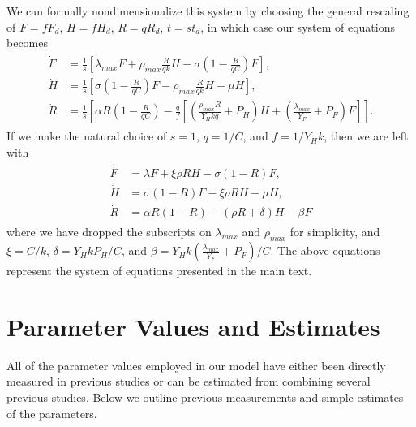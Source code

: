 \documentclass{pnastwo}
\begin{document}
\begin{article}
We can formally nondimensionalize this system by choosing the general rescaling of $F=fF_{d}$, $H=fH_{d}$, $R=qR_{d}$, $t=st_{d}$, in which case our system of equations becomes
\begin{align}
\begin{split}
\dot{F} &= \frac{1}{s}\left[\lambda_{max} F + \rho_{max}\frac{R}{qk}H - \sigma \left(1-\frac{R}{qC}\right)F\right],  \\
\dot{H} &= \frac{1}{s}\left[\sigma \left(1-\frac{R}{qC}\right)F - \rho_{max}\frac{R}{qk} H - \mu H\right],  \\
\dot{R} &= \frac{1}{s}\left[\alpha R\left(1-\frac{R}{qC}\right) -\frac{q}{f}\left[\left(\frac{\rho_{max}R}{Y_{H}kq}+P_{H}\right)H+\left(\frac{\lambda_{max}}{Y_{F}}+P_{F}\right) F\right]\right].
\end{split}
\end{align}
If we make the natural choice of $s=1$, $q=1/C$, and $f=1/Y_{H}k$, then we are left with
\begin{align}
\begin{split}
\dot{F} &= \lambda F + \xi \rho RH - \sigma \left(1-R\right)F,  \\
\dot{H} &= \sigma \left(1-R\right)F - \xi \rho RH - \mu H,  \\
\dot{R} &= \alpha R\left(1-R\right) -\left(\rho R+\delta\right)H-\beta F
\end{split}
\end{align}
where we have dropped the subscripts on $\lambda_{max}$ and $\rho_{max}$ for simplicity, and $\xi=C/k$, $\delta=Y_{H}kP_{H}/C$, and $\beta=Y_{H}k\left(\frac{\lambda_{max}}{Y_{F}}+P_{F}\right)/C$. The above equations represent the system of equations presented in the main text.

\section*{Parameter Values and Estimates}


All of the parameter values employed in our model have either been directly measured in previous studies or can be estimated from combining several previous studies. Below we outline previous measurements and simple estimates of the parameters.


\end{article}
\end{document}

